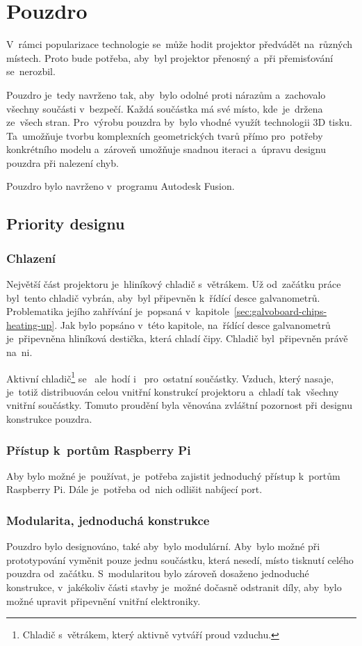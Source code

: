 \section{Pouzdro}

V~rámci popularizace technologie se~může hodit projektor předvádět na~různých místech. Proto bude potřeba, aby~byl projektor přenosný a~při přemisťování se~nerozbil.

Pouzdro je~tedy navrženo tak, aby~bylo odolné proti nárazům a~zachovalo všechny součásti v~bezpečí. Každá součástka má své místo, kde~je~držena ze~všech stran. Pro~výrobu pouzdra by~bylo vhodné využít technologii 3D tisku. Ta~umožňuje tvorbu komplexních geometrických tvarů přímo pro~potřeby konkrétního modelu a~zároveň umožňuje snadnou iteraci a~úpravu designu pouzdra při nalezení chyb.

Pouzdro bylo navrženo v~programu Autodesk Fusion.

\subsection{Priority designu} \label{sec:krabick-design-priorities}
\subsubsection{Chlazení}
Největší část projektoru je~hliníkový chladič s~větrákem. Už od~začátku práce byl~tento chladič vybrán, aby~byl připevněn k~řídící desce galvanometrů. Problematika jejího zahřívání je~popsaná v~kapitole~\ref{sec:galvoboard-chips-heating-up}.
Jak bylo popsáno v~této kapitole, na~řídící desce galvanometrů je~připevněna hliníková destička, která chladí čipy. Chladič byl~připevněn právě na~ni.

Aktivní chladič\footnote{Chladič s~větrákem, který aktivně vytváří proud vzduchu.} se ~ale~hodí i ~pro~ostatní součástky. Vzduch, který nasaje, je~totiž distribuován celou vnitřní konstrukcí projektoru a~chladí tak~všechny vnitřní součástky. Tomuto proudění byla věnována zvláštní pozornost při designu konstrukce pouzdra.

\subsubsection{Přístup k~portům Raspberry Pi}
Aby bylo možné je~používat, je~potřeba zajistit jednoduchý přístup k~portům Raspberry Pi. Dále je~potřeba od~nich odlišit nabíjecí port.

\subsubsection{Modularita, jednoduchá konstrukce}
Pouzdro bylo designováno, také aby~bylo modulární. Aby~bylo možné při prototypování vyměnit pouze jednu součástku, která nesedí, místo tisknutí celého pouzdra od~začátku. S~modularitou bylo zároveň dosaženo jednoduché konstrukce, v~jakékoliv části stavby je~možné dočasně odstranit díly, aby~bylo možné upravit připevnění vnitřní elektroniky.

